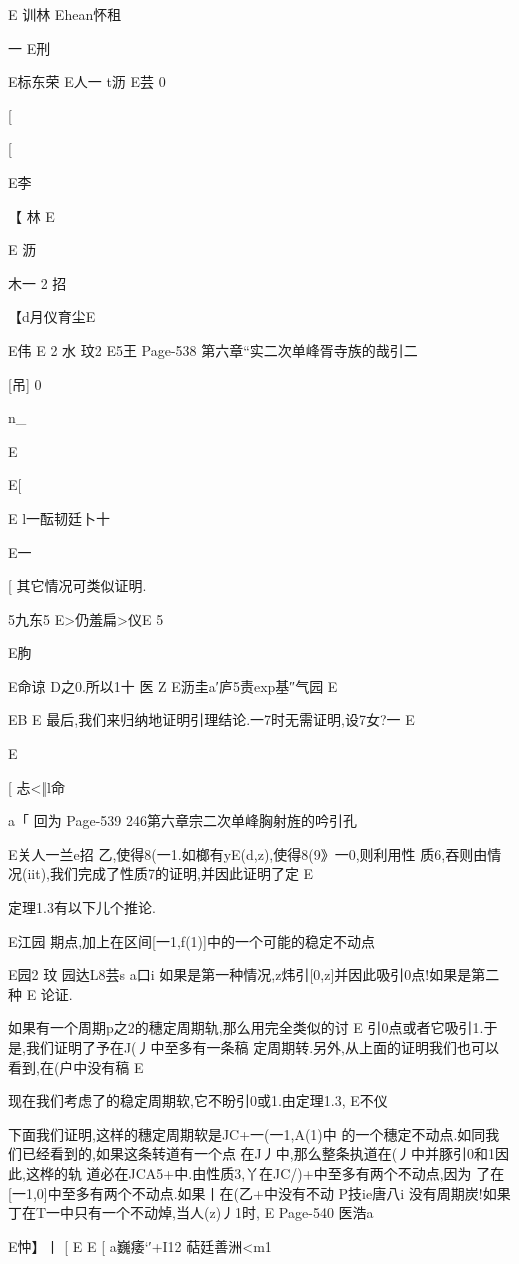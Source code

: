 {{E
训林
Ehean怀租

一
E刑

E标东荣
E人一
t沥
E芸
0

[

[

E李

【
林
E

E
沥

木一
2
招

【d月仪育尘E

E伟
E
2
水
玟2
E5王
Page-538
第六章“实二次单峰胥寺族的哉引二

[吊]
0

n_

E

E[

E
l一酝韧廷卜十

E一

[
其它情况可类似证明.

5九东5
E>仍羞扁>仪E
5

E朐

E命谅
D之0.所以1十
医
Z
E沥圭a′庐5责exp基″气园
E

EB
E
最后,我们来归纳地证明引理结论.一7时无需证明,设7女?一
E

E

[
忐<‖l命

a「
回为
Page-539
246第六章宗二次单峰胸射旌的吟引孔

E关人一兰e招
乙,使得8(一1.如榔有yE(d,z),使得8(9》一0,则利用性
质6,吞则由情况(iit),我们完成了性质7的证明,并因此证明了定
E

定理1.3有以下儿个推论.

E江园
期点,加上在区间[一1,f(1)]中的一个可能的稳定不动点

E园2
玟
园达L8芸s
a口i
如果是第一种情况,z炜引[0,z]并因此吸引0点!如果是第二种
E
论证.

如果有一个周期p之2的穗定周期轨,那么用完全类似的讨
E
引0点或者它吸引1.于是,我们证明了予在J(丿中至多有一条稿
定周期转.另外,从上面的证明我们也可以看到,在(户中没有稿
E

现在我们考虑了的稳定周期软,它不盼引0或1.由定理1.3,
E不仪

下面我们证明,这样的穗定周期软是JC+一(一1,A(1)中
的一个穗定不动点.如同我们已经看到的,如果这条转道有一个点
在J丿中,那么整条执道在(丿中并豚引0和1因此,这桦的轨
道必在JCA5+中.由性质3,丫在JC/)+中至多有两个不动点,因为
了在[一1,0]中至多有两个不动点.如果丨在(乙+中没有不动
P技ie唐八i
没有周期炭!如果丁在T一中只有一个不动焯,当人(z)丿1时,
E
Page-540
医浩a

E忡】丨
[
E
E
[
a巍痿`′+I12
萜廷善洲<m1

}}
